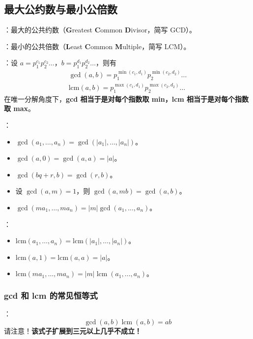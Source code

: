 \subsection{最大公约数与最小公倍数}

：最大的公共约数（\textbf{G}reatest \textbf{C}ommon \textbf{D}ivisor，简写 GCD）。

：最小的公共倍数（\textbf{L}east \textbf{C}ommon \textbf{M}ultiple，简写 LCM）。

：设 $a = p_1^{c_1}p_2^{c_2}\dots$，$b = p_1^{d_1}p_2^{d_2} \dots$，则有
\[
\begin{gathered}
\gcd(a, b) = p_1^{\min(c_1, d_1)}p_2^{\min(c_2, d_2)} \dots \\
\mathrm{lcm}(a, b) = p_1^{\max(c_1, d_1)}p_2^{\max(c_2, d_2)} \dots
\end{gathered}
\]
在唯一分解角度下，\textbf{gcd 相当于是对每个指数取 min，lcm 相当于是对每个指数取 max}。

：

\begin{itemize}
    \item $\gcd(a_1, \dots, a_n) = \gcd(|a_1|, \dots, |a_n|)$。
    \item $\gcd(a, 0) = \gcd(a, a) = |a|$。
    \item $\gcd(bq + r, b) = \gcd(r, b)$。
    \item 设 $\gcd(a, m) = 1$，则 $\gcd(a, mb) = \gcd(a, b)$。
    \item $\gcd(ma_1, \dots, ma_n) = |m| \gcd(a_1, \dots, a_n)$。
\end{itemize}

：

\begin{itemize}
    \item $\mathrm{lcm}(a_1, \dots, a_n) = \mathrm{lcm}(|a_1|, \dots, |a_n|)$。
    \item $\mathrm{lcm}(a, 1) = \mathrm{lcm}(a, a) = |a|$。
    \item $\mathrm{lcm}(ma_1, \dots, ma_n) = |m| \operatorname{lcm}(a_1, \dots, a_n)$。
\end{itemize}

\subsubsection{gcd 和 lcm 的常见恒等式}

：
\[
\gcd(a, b) \operatorname{lcm}(a, b) = ab
\]
请注意！\textbf{该式子扩展到三元以上几乎不成立！}

